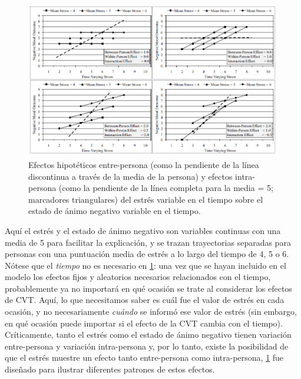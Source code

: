 \documentclass[spanish]{article}
\numberwithin{figure}{subsection}
\numberwithin{equation}{subsection}
\numberwithin{table}{subsection}
\begin{document}
\begin{figure}
	\centering
	\includegraphics{img/lessa1.png}
	\caption{Efectos hipotéticos entre-persona (como la pendiente de la línea discontinua a través de la media de la persona)
	y efectos intra-persona (como la pendiente de la línea completa para la media = 5; marcadores triangulares) del estrés
	variable en el tiempo sobre el estado de ánimo negativo variable en el tiempo.}
	\label{lessa_1}
\end{figure}

Aquí el estrés y el estado de ánimo negativo son variables continuas con una media de 5 para facilitar la explicación,
y se trazan trayectorias separadas para personas con una puntuación media de estrés a lo largo del tiempo de 4, 5 o 6.
Nótese que el \textit{tiempo} no es necesario en \ref{lessa_1}: una vez que se hayan incluido en el modelo los efectos fijos
y aleatorios necesarios relacionados con el tiempo, probablemente ya no importará en qué ocasión se trate al considerar
los efectos de CVT. Aquí, lo que necesitamos saber es cuál fue el valor de estrés en cada ocasión, y no necesariamente
\textit{cuándo} se informó ese valor de estrés (sin embargo, en qué ocasión puede importar si el efecto de la CVT cambia
con el tiempo). Críticamente, tanto el estrés como el estado de ánimo negativo tienen variación entre-persona y
variación intra-persona y, por lo tanto, existe la posibilidad de que el estrés muestre un efecto tanto entre-persona como
intra-persona, \ref{lessa_1} fue diseñado para ilustrar diferentes patrones de estos efectos.
\end{document}
